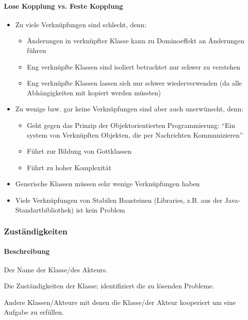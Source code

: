 \documentclass[
    ngerman,
    color=3b,
    summary,
    boxarc,
    main,
]{rubos-tuda-template}
\begin{document}
\paragraph{Lose Kopplung vs. Feste Kopplung}
\begin{itemize}
    \item Zu viele Verknüpfungen sind schlecht, denn:\begin{itemize}
              \item Änderungen in verknüpfter Klasse kann zu Dominoeffekt an Änderungen führen
              \item Eng verknüpfte Klassen sind isoliert betrachtet nur schwer zu verstehen
              \item Eng verknüpfte Klassen lassen sich nur schwer wiederverwenden (da alle Abhängigkeiten mit kopiert werden müssten)
          \end{itemize}
    \item Zu wenige bzw. gar keine Verknüpfungen sind aber auch unerwünscht, denn:\begin{itemize}
              \item Geht gegen das Prinzip der Objektorientierten Programmierung: "`Ein system von Verknüpften Objekten, die per Nachrichten Kommunizieren"'
              \item Führt zur Bildung von Gottklassen
              \item Führt zu hoher Komplexität
          \end{itemize}
    \item Generische Klassen müssen sehr wenige Verknüpfungen haben
    \item Viele Verknüpfungen von Stabilen Bausteinen (Libraries, z.B. aus der Java-Standartbibliothek) ist kein Problem
\end{itemize}
\clearpage
\subsubsection{Zuständigkeiten}

\paragraph{Beschreibung}\mbox{}\par
\begin{description}[leftmargin = 3cm]
    \item[Class] Der Name der Klasse/des Akteurs.
    \item[Responsibilities] Die Zuständigkeiten der Klasse; identifiziert die zu lösenden Probleme.
    \item[Collaborations] Andere Klassen/Akteure mit denen die Klasse/der Akteur kooperiert um eine Aufgabe zu erfüllen.
\end{description}
\end{document}
